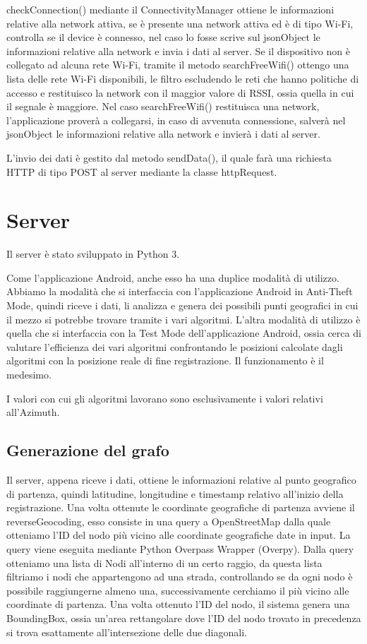 \documentclass[12pt,a4paper,openright,twoside]{report}
\begin{document}
checkConnection() mediante il ConnectivityManager ottiene le informazioni relative alla network attiva, se è presente una network attiva ed è di tipo Wi-Fi, controlla se il device è connesso, nel caso lo fosse scrive sul jsonObject le informazioni relative alla network e invia i dati al server.
Se il dispositivo non è collegato ad alcuna rete Wi-Fi, tramite il metodo searchFreeWifi() ottengo una lista delle rete Wi-Fi disponibili, le filtro escludendo le reti che hanno politiche di accesso e restituisco la network con il maggior valore di RSSI, ossia quella in cui il segnale è maggiore. 
Nel caso searchFreeWifi() restituisca una network, l'applicazione proverà a collegarsi, in caso di avvenuta connessione, salverà nel jsonObject le informazioni relative alla network e invierà i dati al server.

L'invio dei dati è gestito dal metodo sendData(), il quale farà una richiesta HTTP di tipo POST al server mediante la classe httpRequest.

\newpage
\section{Server}
Il server è stato sviluppato in Python 3.

Come l'applicazione Android, anche esso ha una duplice modalità di utilizzo. Abbiamo la modalità che si interfaccia con l'applicazione Android in Anti-Theft Mode, quindi riceve i dati, li analizza e genera dei possibili punti geografici in cui il mezzo si potrebbe trovare tramite i vari algoritmi. L'altra modalità di utilizzo è quella che si interfaccia con la Test Mode dell'applicazione Android, ossia cerca di valutare l'efficienza dei vari algoritmi confrontando le posizioni calcolate dagli algoritmi con la posizione reale di fine registrazione. 
Il funzionamento è il medesimo.

I valori con cui gli algoritmi lavorano sono esclusivamente i valori relativi all'Azimuth.

\subsection{Generazione del grafo}

Il server, appena riceve i dati, ottiene le informazioni relative al punto geografico di partenza, quindi latitudine, longitudine e timestamp relativo all'inizio della registrazione.
Una volta ottenute le coordinate geografiche di partenza avviene il reverseGeocoding, esso consiste in una query a OpenStreetMap dalla quale otteniamo l'ID del nodo più vicino alle coordinate geografiche date in input. La query viene eseguita mediante Python Overpass Wrapper (Overpy). Dalla query otteniamo una lista di Nodi all'interno di un certo raggio, da questa lista filtriamo i nodi che appartengono ad una strada, controllando se da ogni nodo è possibile raggiungerne almeno una, successivamente cerchiamo il più vicino alle coordinate di partenza.
Una volta ottenuto l'ID del nodo, il sistema genera una BoundingBox, ossia un'area rettangolare dove l'ID del nodo trovato in precedenza si trova esattamente all'intersezione delle due diagonali. 
\end{document}
